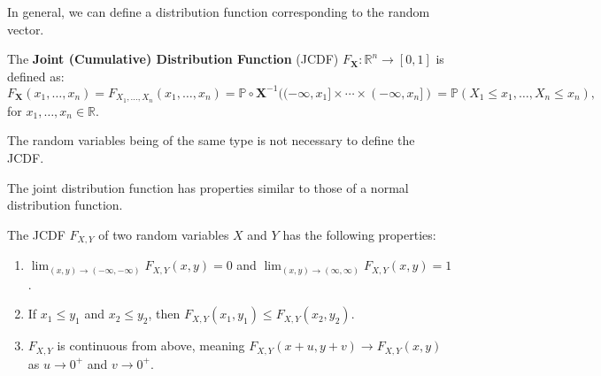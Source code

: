 \documentclass{huhtakm-template-book-v2}
\newcommand{\prob}{\mathbb{P}}
\begin{document}
    In general, we can define a distribution function corresponding to the random vector.
    \begin{defn}
        The \textbf{Joint (Cumulative) Distribution Function} (JCDF) $F_{\mathbf{X}}:\mathbb{R}^{n} \to [0,1]$ is defined as:
        \begin{equation*}
            F_{\mathbf{X}}(x_{1},\dots,x_{n}) = F_{X_{1},\dots,X_{n}}(x_{1},\dots,x_{n}) = \prob \circ \mathbf{X}^{-1}((-\infty,x_{1}]\times\cdots\times(-\infty,x_{n}]) = \prob(X_{1} \leq x_{1},\dots,X_{n} \leq x_{n}),
        \end{equation*}
        for $x_{1},\dots,x_{n} \in \mathbb{R}$.
    \end{defn}
    \begin{rem}
        The random variables being of the same type is not necessary to define the JCDF.
    \end{rem}
    The joint distribution function has properties similar to those of a normal distribution function.
    \begin{lem}
        The JCDF $F_{X,Y}$ of two random variables $X$ and $Y$ has the following properties:
        \begin{enumerate}
            \item $\lim_{(x, y) \to (-\infty,-\infty)}F_{X,Y}(x, y) = 0$ and $\lim_{(x, y) \to (\infty,\infty)}F_{X,Y}(x, y) = 1$.
            \item If $x_{1} \leq y_{1}$ and $x_{2} \leq y_{2}$, then $F_{X,Y}(x_{1},y_{1}) \leq F_{X,Y}(x_{2},y_{2})$.
            \item $F_{X,Y}$ is continuous from above, meaning $F_{X,Y}(x+u,y+v) \to F_{X,Y}(x, y)$ as $u \to 0^{+}$ and $v \to 0^{+}$.
        \end{enumerate}
    \end{lem}
    \newpage
\end{document}
